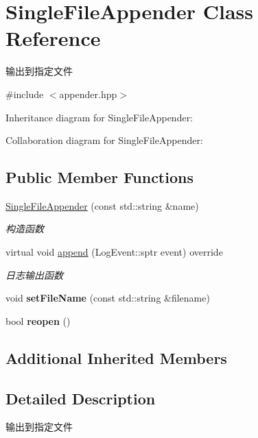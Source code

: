 \hypertarget{classSingleFileAppender}{}\section{Single\+File\+Appender Class Reference}
\label{classSingleFileAppender}


输出到指定文件  




{\ttfamily \#include $<$appender.\+hpp$>$}



Inheritance diagram for Single\+File\+Appender\+:


Collaboration diagram for Single\+File\+Appender\+:
\subsection*{Public Member Functions}
\begin{DoxyCompactItemize}
\item 
\hyperlink{classSingleFileAppender_a2bebe6f26c13faa8da336bfdd420de34}{Single\+File\+Appender} (const std\+::string \&name)
\begin{DoxyCompactList}\small\item\em 构造函数 \end{DoxyCompactList}\item 
virtual void \hyperlink{classSingleFileAppender_a704503dbaa2cf1ec75ccc08e2bd26c76}{append} (Log\+Event\+::sptr event) override
\begin{DoxyCompactList}\small\item\em 日志输出函数 \end{DoxyCompactList}\item 
\mbox{\label{classSingleFileAppender_adf917855dda6da847b20d6fb672f4418}} 
void {\bfseries set\+File\+Name} (const std\+::string \&filename)
\item 
\mbox{\label{classSingleFileAppender_a3b269d6d626cc23a9ae8bf4abfa6e2b1}} 
bool {\bfseries reopen} ()
\end{DoxyCompactItemize}
\subsection*{Additional Inherited Members}


\subsection{Detailed Description}
输出到指定文件 


